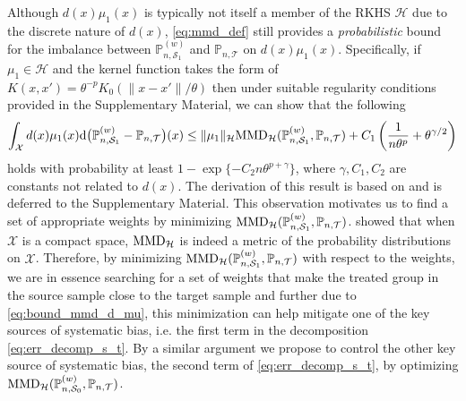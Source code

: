 \documentclass[12pt]{article}
\newcommand{\prob}{\mathbb{P}}
\begin{document}
Although $d(x)\mu_1(x)$ is typically not itself a member of the RKHS $\mathcal{H}$ due to the discrete nature of $d(x)$, \eqref{eq:mmd_def} still provides a \textit{probabilistic} bound for the imbalance between $\prob_{n,\mathcal{S}_1}^{(w)}$ and $\prob_{n,\mathcal{T}}$ on $d(x)\mu_1(x)$. Specifically, if $\mu_1 \in \mathcal{H}$ and the kernel function takes the form of $K(x, x') = \theta^{-p} K_0(\|x-x'\| / \theta)$ then under suitable regularity conditions provided in the Supplementary Material, we can show that the following 
\begin{equation}
    \label{eq:bound_mmd_d_mu}
    \int_\mathcal{X} d(x) \mu_1(x) \textnormal{d} \big( \prob_{n,\mathcal{S}_1}^{(w)} - \prob_{n,\mathcal{T}}\big)(x)
    \le
    \| \mu_1 \|_\mathcal{H}
    \textnormal{MMD}_\mathcal{H}(\prob_{n,\mathcal{S}_1}^{(w)}, \prob_{n,\mathcal{T}}) +
    C_1 \left( \frac{1}{n \theta^p} + \theta^{\gamma/2} \right)
\end{equation}
holds with probability at least $1 - \exp\{-C_2 n \theta^{p + \gamma}\}$, where $\gamma, C_1, C_2$ are constants not related to $d(x)$. The derivation of this result is based on \citet{gretton2012kernel} and is deferred to the Supplementary Material. This observation motivates us to find a set of appropriate weights by minimizing $\textnormal{MMD}_\mathcal{H}(\prob_{n,\mathcal{S}_1}^{(w)}, \prob_{n,\mathcal{T}})$.
\citet{gretton2012kernel} showed that when $\mathcal{X}$ is a compact space, $\textnormal{MMD}_\mathcal{H}$ is indeed a metric of the probability distributions on $\mathcal{X}$. Therefore, by minimizing $\textnormal{MMD}_\mathcal{H}(\prob_{n,\mathcal{S}_1}^{(w)}, \prob_{n,\mathcal{T}})$ with respect to the weights, we are in essence searching for a set of weights that make the treated group in the source sample close to the target sample and further due to \eqref{eq:bound_mmd_d_mu}, this minimization can help mitigate one of the key sources of systematic bias, i.e. the first term in the decomposition \eqref{eq:err_decomp_s_t}.
By a similar argument we propose to control the other key source of systematic bias, the second term of \eqref{eq:err_decomp_s_t}, by optimizing $\textnormal{MMD}_\mathcal{H}(\prob_{n,\mathcal{S}_0}^{(w)}, \prob_{n,\mathcal{T}})$.
\end{document}
